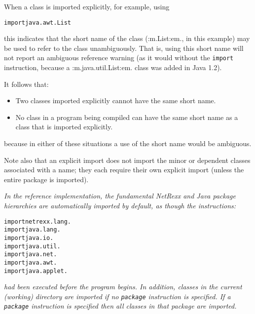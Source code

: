 When a class is imported explicitly, for example, using
\begin{alltt}
import java.awt.List
\end{alltt}
this indicates that the short name of the class (:m.List:em.,
in this example) may be used to refer to the class unambiguously.
That is, using this short name will not report an ambiguous reference
warning (as it would without the \texttt{import} instruction, because
a :m.java.util.List:em. class was added in Java 1.2).
 
It follows that:
\begin{itemize}
\item Two classes imported explicitly cannot have the same short name.
\item No class in a program being compiled can have the same short name as
a class that is imported explicitly.
\end{itemize}
because in either of these situations a use of the short name would
be ambiguous.
 
Note also that an explicit import does not import the minor or dependent
classes associated with a name; they each require their own explicit
import (unless the entire package is imported).
 
\emph{In the reference implementation, the fundamental NetRexx and Java
package hierarchies are automatically imported by default, as though the
instructions:}
\begin{alltt}
import netrexx.lang.
import java.lang.
import java.io.
import java.util.
import java.net.
import java.awt.
import java.applet.
\end{alltt}
\emph{had been executed before the program begins.
In addition, classes in the current (working) directory are imported if
no \texttt{package} instruction is specified.  If a \texttt{package}
instruction is specified then all classes in that package are imported.
}
